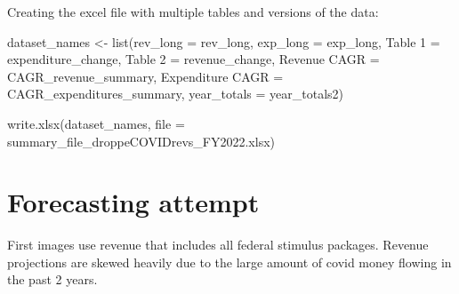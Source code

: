 \documentclass[
  letterpaper,
  DIV=11,
  numbers=noendperiod]{scrreport}
\newenvironment{Shaded}{\begin{snugshade}}{\end{snugshade}}
\newcommand{\AttributeTok}[1]{\textcolor[rgb]{0.40,0.45,0.13}{#1}}
\newcommand{\FunctionTok}[1]{\textcolor[rgb]{0.28,0.35,0.67}{#1}}
\newcommand{\NormalTok}[1]{\textcolor[rgb]{0.00,0.23,0.31}{#1}}
\newcommand{\OtherTok}[1]{\textcolor[rgb]{0.00,0.23,0.31}{#1}}
\newcommand{\StringTok}[1]{\textcolor[rgb]{0.13,0.47,0.30}{#1}}
\begin{document}
Creating the excel file with multiple tables and versions of the data:

\begin{Shaded}
\begin{Highlighting}[]
\NormalTok{dataset\_names }\OtherTok{\textless{}{-}} \FunctionTok{list}\NormalTok{(}\StringTok{\textquotesingle{}rev\_long\textquotesingle{}} \OtherTok{=}\NormalTok{ rev\_long, }\StringTok{\textquotesingle{}exp\_long\textquotesingle{}} \OtherTok{=}\NormalTok{ exp\_long, }
                      \StringTok{\textquotesingle{}Table 1\textquotesingle{}} \OtherTok{=}\NormalTok{ expenditure\_change, }\StringTok{\textquotesingle{}Table 2\textquotesingle{}} \OtherTok{=}\NormalTok{ revenue\_change,}
                      \StringTok{\textquotesingle{}Revenue CAGR\textquotesingle{}} \OtherTok{=}\NormalTok{ CAGR\_revenue\_summary, }\StringTok{\textquotesingle{}Expenditure CAGR\textquotesingle{}} \OtherTok{=}\NormalTok{ CAGR\_expenditures\_summary, }
                      \StringTok{\textquotesingle{}year\_totals\textquotesingle{}} \OtherTok{=}\NormalTok{ year\_totals2)}

\FunctionTok{write.xlsx}\NormalTok{(dataset\_names, }\AttributeTok{file =} \StringTok{\textquotesingle{}summary\_file\_droppeCOVIDrevs\_FY2022.xlsx\textquotesingle{}}\NormalTok{)}
\end{Highlighting}
\end{Shaded}

\hypertarget{forecasting-attempt}{%
\section{Forecasting attempt}\label{forecasting-attempt}}

First images use revenue that includes all federal stimulus packages.
Revenue projections are skewed heavily due to the large amount of covid
money flowing in the past 2 years.
\end{document}
